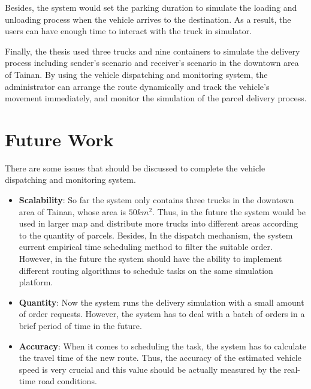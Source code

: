 \documentclass[12pt]{ksthesis}
\begin{document}
\begin{thesis}
{Besides, the system would set the parking duration to simulate the loading and unloading process when the vehicle arrives to the destination. As a result, the users can have enough time to interact with the truck in simulator. 

Finally, the thesis used three trucks and nine containers to simulate the delivery process including sender’s scenario and receiver’s scenario in the downtown area of Tainan. By using the vehicle dispatching and monitoring system, the administrator can arrange the route dynamically and track the vehicle’s movement immediately, and monitor the simulation of the parcel delivery process.




\section{Future Work}

There are some issues that should be discussed to complete the vehicle dispatching and monitoring system.

\begin{itemize}


\item
\textbf{Scalability}: So far the system only contains three trucks in the downtown area of Tainan, whose area is $50km^{2}$. Thus, in the future the system would be used in larger map and distribute more trucks into different areas according to the quantity of parcels. Besides, In the dispatch mechanism, the system current empirical time scheduling method to filter the suitable order. However, in the future the system should have the ability to implement different routing algorithms to schedule tasks on the same simulation platform.

\item
\textbf{Quantity}: Now the system runs the delivery simulation with a small amount of order requests. However, the system has to deal with a batch of orders in a brief period of time in the future.

\item
\textbf{Accuracy}: When it comes to scheduling the task, the system has to calculate the travel time of the new route. Thus, the accuracy of the estimated vehicle speed is very crucial and this value should be actually measured by the real-time road conditions.

\end{itemize}

\cite{Fischer}


} \end{thesis}
\end{document}
